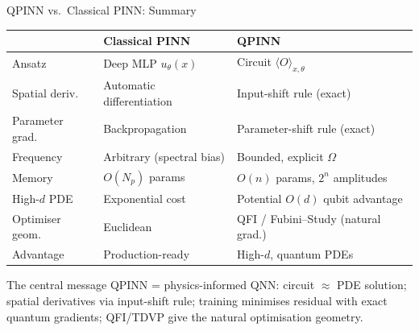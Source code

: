 \documentclass[aspectratio=169,11pt]{beamer}
\begin{document}
\begin{frame}{QPINN vs.\ Classical PINN: Summary}
\footnotesize
  \begin{center}
  \renewcommand{\arraystretch}{1.0}
  \begin{tabular}{p{2.4cm}p{3.9cm}p{3.9cm}}
    \toprule
    & \textbf{Classical PINN} & \textbf{QPINN} \\
    \midrule
    Ansatz
      & Deep MLP $u_\theta(x)$
      & Circuit $\langle O\rangle_{x,\theta}$ \\
    Spatial deriv.
      & Automatic differentiation
      & Input-shift rule (exact) \\
    Parameter grad.
      & Backpropagation
      & Parameter-shift rule (exact) \\
    Frequency
      & Arbitrary (spectral bias)
      & Bounded, explicit $\Omega$ \\
    Memory
      & $O(N_p)$ params
      & $O(n)$ params, $2^n$ amplitudes \\
    High-$d$ PDE
      & Exponential cost
      & Potential $O(d)$ qubit advantage \\
    Optimiser geom.
      & Euclidean
      & QFI / Fubini--Study (natural grad.) \\
    Advantage
      & Production-ready
      & High-$d$, quantum PDEs \\
    \bottomrule
  \end{tabular}
  \end{center}
  \begin{alertblock}{The central message}\footnotesize
    QPINN = physics-informed QNN: circuit $\approx$ PDE solution;
    spatial derivatives via input-shift rule;
    training minimises residual with exact quantum gradients;
    QFI/TDVP give the natural optimisation geometry.
  \end{alertblock}
\end{frame}
\end{document}
